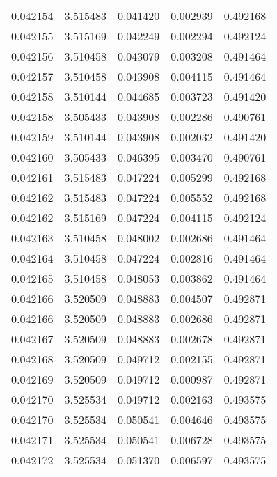 \begin{tabular}{lrrrr}
0.042154    &  3.515483 &  0.041420 &  0.002939 &             0.492168 \\
0.042155    &  3.515169 &  0.042249 &  0.002294 &             0.492124 \\
0.042156    &  3.510458 &  0.043079 &  0.003208 &             0.491464 \\
0.042157    &  3.510458 &  0.043908 &  0.004115 &             0.491464 \\
0.042158    &  3.510144 &  0.044685 &  0.003723 &             0.491420 \\
0.042158    &  3.505433 &  0.043908 &  0.002286 &             0.490761 \\
0.042159    &  3.510144 &  0.043908 &  0.002032 &             0.491420 \\
0.042160    &  3.505433 &  0.046395 &  0.003470 &             0.490761 \\
0.042161    &  3.515483 &  0.047224 &  0.005299 &             0.492168 \\
0.042162    &  3.515483 &  0.047224 &  0.005552 &             0.492168 \\
0.042162    &  3.515169 &  0.047224 &  0.004115 &             0.492124 \\
0.042163    &  3.510458 &  0.048002 &  0.002686 &             0.491464 \\
0.042164    &  3.510458 &  0.047224 &  0.002816 &             0.491464 \\
0.042165    &  3.510458 &  0.048053 &  0.003862 &             0.491464 \\
0.042166    &  3.520509 &  0.048883 &  0.004507 &             0.492871 \\
0.042166    &  3.520509 &  0.048883 &  0.002686 &             0.492871 \\
0.042167    &  3.520509 &  0.048883 &  0.002678 &             0.492871 \\
0.042168    &  3.520509 &  0.049712 &  0.002155 &             0.492871 \\
0.042169    &  3.520509 &  0.049712 &  0.000987 &             0.492871 \\
0.042170    &  3.525534 &  0.049712 &  0.002163 &             0.493575 \\
0.042170    &  3.525534 &  0.050541 &  0.004646 &             0.493575 \\
0.042171    &  3.525534 &  0.050541 &  0.006728 &             0.493575 \\
0.042172    &  3.525534 &  0.051370 &  0.006597 &             0.493575 \\

\end{tabular}
